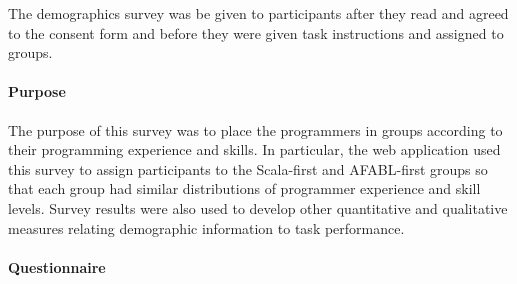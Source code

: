 The demographics survey was be given to participants after they read and agreed to the consent form and before they were given task instructions and assigned to groups.

\paragraph{Purpose}

The purpose of this survey was to place the programmers in groups according to their programming experience and skills.  In particular, the web application used this survey to assign participants to the Scala-first and AFABL-first groups so that each group had similar distributions of programmer experience and skill levels.  Survey results were also used to develop other quantitative and qualitative measures relating demographic information to task performance.

\paragraph{Questionnaire}

